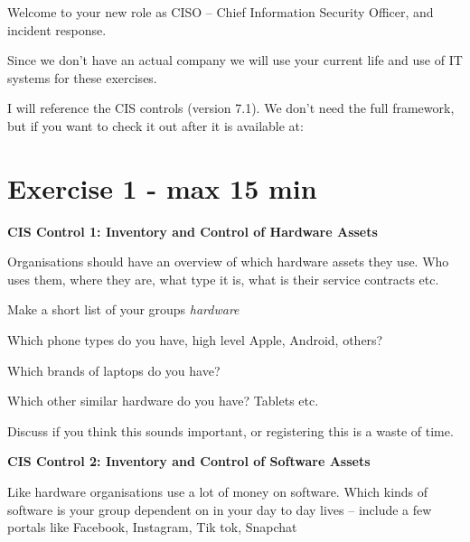 \documentclass[a4paper,11pt,notitlepage,landscape]{report}
\begin{document}
\rm
{}

\newcommand{\subject}[1]{Introduction to Incident Response Elective, KEA}



\normal

Welcome to your new role as CISO -- Chief Information Security Officer, and incident response.

Since we don't have an actual company we will use your current life and use of IT systems for these exercises.

I will reference the CIS controls (version 7.1). We don't need the full framework, but if you want to check it out after it is available at: 



\eject
\section*{Exercise 1 - max 15 min}

{\bf CIS Control 1: Inventory and Control of Hardware Assets}

Organisations should have an overview of which hardware assets they use. Who uses them, where they are, what type it is, what is their service contracts etc.

Make a short list of your groups  \emph{hardware}

\begin{list1}
\item[\faSquareO] Which phone types do you have, high level Apple, Android, others?
\item[\faSquareO] Which brands of laptops do you have?
\item[\faSquareO] Which other similar hardware do you have? Tablets etc.
\end{list1}

Discuss if you think this sounds important, or registering this is a waste of time.


{\bf CIS Control 2: Inventory and Control of Software Assets}

Like hardware organisations use a lot of money on software. Which kinds of software is your group dependent on in your day to day lives -- include a few portals like Facebook, Instagram, Tik tok, Snapchat
\end{document}
